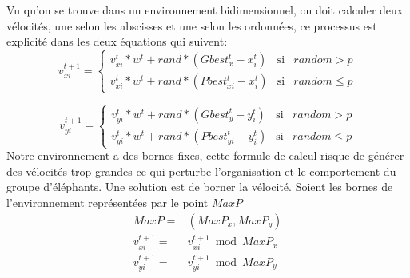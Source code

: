 Vu qu'on se trouve dans un environnement bidimensionnel, on doit calculer deux vélocités, une selon les abscisses et une selon les ordonnées, ce processus est explicité dans les deux équations qui suivent:
\begin{equation}
v_{xi}^{t+1}=
\left\lbrace
\begin{array}{ccc}
v_{xi}^{t} * w^t + rand * (Gbest_{x}^{t} - x_{i}^{t} ) & \mbox{si} & random > p\\
v_{xi}^{t} * w^t + rand * (Pbest_{xi}^{t} - x_{i}^{t} )  & \mbox{si} & random \leq p
\end{array}\right.
\end{equation}

\begin{equation}
v_{yi}^{t+1}=
\left\lbrace
\begin{array}{ccc}
v_{yi}^{t} * w^t + rand * (Gbest_{y}^{t} - y_{i}^{t} ) & \mbox{si} & random > p\\
v_{yi}^{t} * w^t + rand * (Pbest_{yi}^{t} - y_{i}^{t} )  & \mbox{si} & random \leq p
\end{array}\right.
\end{equation}
Notre environnement a des bornes fixes, cette formule de calcul risque de générer des vélocités trop grandes ce qui perturbe l'organisation et le comportement du groupe d'éléphants. Une solution est de borner la vélocité.
Soient les bornes de l'environnement représentées par le point $MaxP$
\begin{equation}
\begin{split}
MaxP= &(MaxP_{x},MaxP_{y})\\
v_{xi}^{t+1}=&v_{xi}^{t+1} \bmod MaxP_{x}\\
v_{yi}^{t+1}=&v_{yi}^{t+1} \bmod MaxP_{y}
\end{split}
\end{equation}






